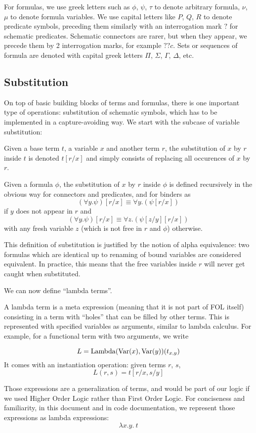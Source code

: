 For formulas, we use greek letters such as $\phi$, $\psi$, $\tau$ to denote arbitrary formula, $\nu$, $\mu$ to denote formula variables. We use capital letters like $P$, $Q$, $R$ to denote predicate symbols, preceding them similarly with an interrogation mark $?$ for schematic predicates. Schematic connectors are rarer, but when they appear, we precede them by 2 interrogation marks, for example $??c$. Sets or sequences of formula are denoted with capital greek letters $\Pi$, $\Sigma$, $\Gamma$, $\Delta$, etc.

\subsection{Substitution}
\label{subs:substitution}
On top of basic building blocks of terms and formulas, there is one important type of operations: substitution of schematic symbols, which has to be implemented in a capture-avoiding way. We start with the subcase of variable substitution:
\begin{defin}
Given a base term $t$, a variable $x$ and another term $r$, the substitution of $x$ by $r$ inside $t$ is denoted $ t[r/x] $ and simply consists of replacing all occurences of $x$ by $r$.

Given a formula $\phi$, the substitution of $x$ by $r$ inside $\phi$ is defined recursively in the obvious way for connectors and predicates, and for binders as
$$
(\forall y. \psi)[r/x] \equiv \forall y. (\psi[r/x])
$$
if $y$ does not appear in $r$ and
$$
(\forall y. \psi)[r/x] \equiv \forall z. (\psi[z/y][r/x])
$$
with any fresh variable $z$ (which is not free in $r$ and $\phi$) otherwise.
\end{defin}


This definition of substitution is justified by the notion of alpha equivalence: two formulas which are identical up to renaming of bound variables are considered equivalent. In practice, this means that the free variables inside $r$ will never get caught when substituted.

We can now define \enquote{lambda terms}.
\begin{defin}
A lambda term is a  meta expression (meaning that it is not part of FOL itself) consisting in a term with ``holes'' that can be filled by other terms. This is represented with specified variables as arguments, similar to lambda calculus. For example, for a functional term with two arguments, we write

$$
L = \operatorname{Lambda}(\operatorname{Var}(x), \operatorname{Var}(y))(t_{x,y})
$$
It comes with an instantiation operation: given terms $r$, $s$,
$$L(r, s) = t[r/x, s/y]$$
\end{defin}
Those expressions are a generalization of terms, and would be part of our logic if we used Higher Order Logic rather than First Order Logic. For conciseness and familiarity, in this document and in code documentation, we represent those expressions as lambda expressions:
$$
\lambda x.y. ~t
$$

